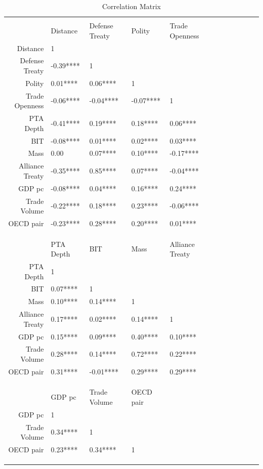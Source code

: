 \documentclass[reqno,onecolumn,letterpaper,12pt]{article}
\begin{document}
\begin{table}[ht]
\caption{Correlation Matrix}
\label{cor_mat}
\centering
\begin{tabular}{rlllllllllll}
\\[-1.8ex]\hline
\hline \\[-1.8ex]
 & Distance & Defense Treaty & Polity & Trade Openness  \\ 
  \hline
  Distance & 1 &  &  &  \\ 
  Defense Treaty & -0.39**** & 1  &  &   \\ 
  Polity &  0.01**** &  0.06**** & 1 &   \\ 
  Trade Openness & -0.06**** & -0.04**** & -0.07**** & 1   \\ 
  PTA Depth & -0.41**** &  0.19**** &  0.18**** &  0.06****   \\ 
  BIT  & -0.08**** &  0.01**** &  0.02**** &  0.03****   \\ 
  Mass &  0.00     &  0.07**** &  0.10**** & -0.17****   \\ 
  Alliance Treaty & -0.35**** &  0.85**** &  0.07**** & -0.04****  \\ 
 GDP pc & -0.08**** &  0.04**** &  0.16**** &  0.24****   \\ 
  Trade Volume & -0.22**** &  0.18**** &  0.23**** & -0.06****  \\ 
  OECD pair & -0.23**** &  0.28**** &  0.20**** &  0.01**** \\ 
\hline \\[-1.8ex]
\\[-1.8ex]\hline
\hline \\[-1.8ex]

 &  PTA Depth & BIT & Mass & Alliance  Treaty  \\ 
  \hline
  PTA Depth &  1 &  &  &    \\ 
  BIT  & 0.07**** &1  &  &    \\ 
  Mass &   0.10**** &  0.14**** &1  &    \\ 
  Alliance Treaty  &  0.17**** &  0.02**** &  0.14**** & 1  \\ 
 GDP pc &  0.15**** &  0.09**** &  0.40**** &  0.10****  \\ 
  Trade Volume  &  0.28**** &  0.14**** &  0.72**** &  0.22****   \\ 
  OECD pair  &  0.31**** & -0.01**** &  0.29**** &  0.29****  \\ 
\hline \\[-1.8ex]
\\[-1.8ex]\hline
\hline \\[-1.8ex]

 & GDP pc & Trade Volume & OECD pair \\ 
  \hline
 GDP pc & 1 &  &\\ 
  Trade Volume &  0.34**** & 1 &\\ 
  OECD pair  &  0.23**** &  0.34****&1 \\ 
\hline \\[-1.8ex]
\\[-1.8ex]\hline
\hline \\[-1.8ex]

\end{tabular}
\end{table}
\end{document}
